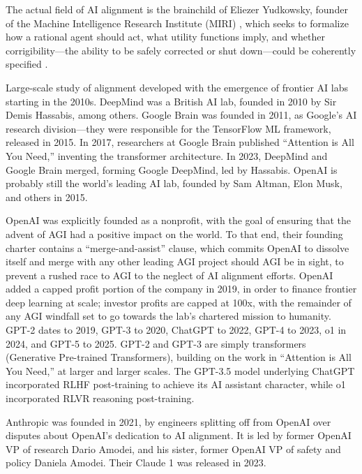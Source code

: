 The actual field of AI alignment is the brainchild of Eliezer Yudkowsky, founder of the Machine Intelligence Research Institute (MIRI)
\cite{yudkowsky2008factor}, which seeks to formalize how a rational agent should act, what utility functions imply, and whether corrigibility---the ability to be safely corrected or shut down---could be coherently specified \cite{soares2015corrigibility}. 

Large-scale study of alignment developed with the emergence of frontier AI labs starting in the 2010s. DeepMind was a British AI lab, founded in 2010 by Sir Demis Hassabis, among others. Google Brain was founded in 2011, as Google's AI research division—they were responsible for the TensorFlow ML framework, released in 2015. In 2017, researchers at Google Brain published ``Attention is All You Need,'' inventing the transformer architecture. In 2023, DeepMind and Google Brain merged, forming Google DeepMind, led by Hassabis. OpenAI is probably still the world's leading AI lab, founded by Sam Altman, Elon Musk, and others in 2015.

OpenAI was explicitly founded as a nonprofit, with the goal of ensuring that the advent of AGI had a positive impact on the world. To that end, their founding charter contains a ``merge-and-assist'' clause, which commits OpenAI to dissolve itself and merge with any other leading AGI project should AGI be in sight, to prevent a rushed race to AGI to the neglect of AI alignment efforts. OpenAI added a capped profit portion of the company in 2019, in order to finance frontier deep learning at scale; investor profits are capped at 100x, with the remainder of any AGI windfall set to go towards the lab's chartered mission to humanity. GPT-2 dates to 2019, GPT-3 to 2020, ChatGPT to 2022, GPT-4 to 2023, o1 in 2024, and GPT-5 to 2025. GPT-2 and GPT-3 are simply transformers (Generative Pre-trained Transformers), building on the work in ``Attention is All You Need,'' at larger and larger scales. The GPT-3.5 model underlying ChatGPT incorporated RLHF post-training to achieve its AI assistant character, while o1 incorporated RLVR reasoning post-training.

Anthropic was founded in 2021, by engineers splitting off from OpenAI over disputes about OpenAI's dedication to AI alignment. It is led by former OpenAI VP of research Dario Amodei, and his sister, former OpenAI VP of safety and policy Daniela Amodei. Their Claude 1 was released in 2023.

